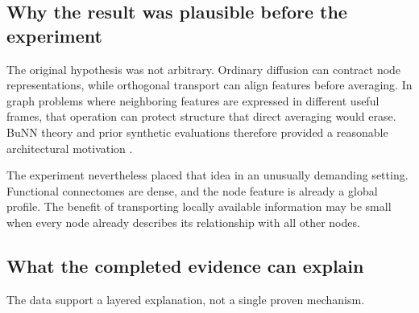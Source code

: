 \documentclass[11pt,a4paper]{article}
\begin{document}
\subsection{Why the result was plausible before the experiment}

The original hypothesis was not arbitrary. Ordinary diffusion can contract
node representations, while orthogonal transport can align features before
averaging. In graph problems where neighboring features are expressed in
different useful frames, that operation can protect structure that direct
averaging would erase. BuNN theory and prior synthetic evaluations therefore
provided a reasonable architectural motivation \cite{bamberger2025bundle}.

The experiment nevertheless placed that idea in an unusually demanding
setting. Functional connectomes are dense, and the node feature is already a
global profile. The benefit of transporting locally available information may
be small when every node already describes its relationship with all other
nodes.

\subsection{What the completed evidence can explain}

The data support a layered explanation, not a single proven mechanism.
\end{document}
